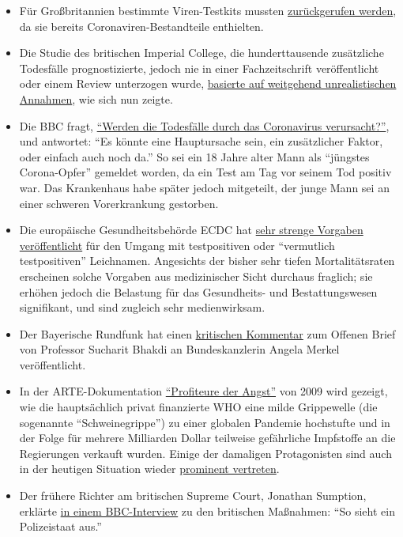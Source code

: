 \begin{itemize}
\tightlist
\item
  Für Großbritannien bestimmte Viren-Testkits mussten
  \href{https://www.telegraph.co.uk/news/2020/03/30/uks-attempt-ramp-coronavirus-testing-hindered-key-components/}{zurückgerufen
  werden}, da sie bereits Coronaviren-Bestandteile enthielten.
\item
  Die Studie des britischen Imperial College, die hunderttausende
  zusätzliche Todesfälle prognostizierte, jedoch nie in einer
  Fachzeitschrift veröffentlicht oder einem Review unterzogen wurde,
  \href{https://judithcurry.com/2020/04/01/imperial-college-uk-covid-19-numbers-dont-seem-to-add-up/}{basierte
  auf weitgehend unrealistischen Annahmen}, wie sich nun zeigte.
\item
  Die BBC fragt,
  \href{https://www.bbc.com/news/health-51979654}{``Werden die
  Todesfälle durch das Coronavirus verursacht?''}, und antwortet: ``Es
  könnte eine Hauptursache sein, ein zusätzlicher Faktor, oder einfach
  auch noch da.'' So sei ein 18 Jahre alter Mann als ``jüngstes
  Corona-Opfer'' gemeldet worden, da ein Test am Tag vor seinem Tod
  positiv war. Das Krankenhaus habe später jedoch mitgeteilt, der junge
  Mann sei an einer schweren Vorerkrankung gestorben.
\item
  Die europäische Gesundheitsbehörde ECDC hat
  \href{https://www.ecdc.europa.eu/sites/default/files/documents/COVID-19-safe-handling-of-bodies-or-persons-dying-from-COVID19.pdf}{sehr
  strenge Vorgaben veröffentlicht} für den Umgang mit testpositiven oder
  ``vermutlich testpositiven'' Leichnamen. Angesichts der bisher sehr
  tiefen Mortalitätsraten erscheinen solche Vorgaben aus medizinischer
  Sicht durchaus fraglich; sie erhöhen jedoch die Belastung für das
  Gesundheits- und Bestattungswesen signifikant, und sind zugleich sehr
  medienwirksam.
\item
  Der Bayerische Rundfunk hat einen
  \href{https://www.br.de/nachrichten/wissen/bhakdis-brief-an-die-kanzlerin-was-ist-dran-an-seinen-fragen,RutYDhd}{kritischen
  Kommentar} zum Offenen Brief von Professor Sucharit Bhakdi an
  Bundeskanzlerin Angela Merkel veröffentlicht.
\item
  In der ARTE-Dokumentation
  \href{https://www.youtube.com/watch?v=1--c2SBYlMY}{``Profiteure der
  Angst''} von 2009 wird gezeigt, wie die hauptsächlich privat
  finanzierte WHO eine milde Grippewelle (die sogenannte
  ``Schweinegrippe'') zu einer globalen Pandemie hochstufte und in der
  Folge für mehrere Milliarden Dollar teilweise gefährliche Impfstoffe
  an die Regierungen verkauft wurden. Einige der damaligen Protagonisten
  sind auch in der heutigen Situation wieder
  \href{https://www.nature.com/articles/news.2009.424}{prominent
  vertreten}.
\item
  Der frühere Richter am britischen Supreme Court, Jonathan Sumption,
  erklärte
  \href{https://www.spectator.co.uk/article/former-supreme-court-justice-this-is-what-a-police-state-is-like-}{in
  einem BBC-Interview} zu den britischen Maßnahmen: ``So sieht ein
  Polizeistaat aus.''
\end{itemize}

